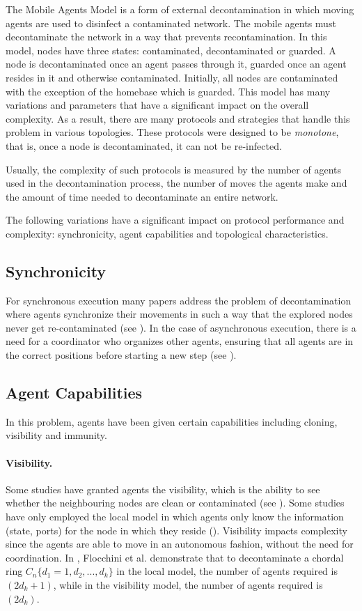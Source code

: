 The Mobile Agents Model is a form of external decontamination in which moving agents are used to disinfect a contaminated network.
The mobile agents must decontaminate the network in a way that prevents recontamination. In this model, nodes have three states: contaminated, decontaminated or guarded. A node is decontaminated once an agent passes through it, guarded once an agent resides in it and otherwise contaminated. Initially, all nodes are contaminated with the exception of the homebase which is guarded. This model has many variations and parameters that have a significant impact on the overall complexity. As a result, there are many protocols and strategies that handle this problem in various topologies. These protocols were designed to be {\em monotone}, that is, once a node is decontaminated, it can not be re-infected.

Usually, the complexity of such protocols is measured by the number of agents used in the decontamination process, the number of moves the agents make and the amount of time needed to decontaminate an entire network.

The following variations have a significant impact on protocol performance and complexity: synchronicity, agent capabilities and topological characteristics.
\subsection{Synchronicity}
For synchronous execution many papers address the problem of decontamination where agents synchronize their movements in such a way that the explored nodes never get re-contaminated  (see \cite{lucetal22,floc21,baretal24}). In the case of asynchronous execution, there is a need for a coordinator who organizes other agents, ensuring that all agents are in the correct positions before starting a new step (see \cite{floetal13,lucetal22,floetal20,floetal19,floetal17}).


\subsection{Agent Capabilities}
In this problem, agents have been given certain capabilities including cloning, visibility and immunity.

\paragraph{ Visibility.}  Some studies have granted agents the visibility, which is the ability to see whether the neighbouring nodes are clean or contaminated (see \cite{floetal17,floetal20}). Some studies have only employed the local model in which agents only know the information (state, ports) for the node in which they reside (\cite{floetal19,floetal17,floetal20}). Visibility impacts complexity since the agents are able to move in an autonomous fashion, without the need for coordination. In \cite{floetal17}, Flocchini et al. demonstrate that to decontaminate a chordal ring $C_n\{d_1=1,d_2,...,d_k\}$ in the local model, the number of agents required is $(2d_k+1)$, while in the visibility model, the number of agents required is $(2  d_k)$.

